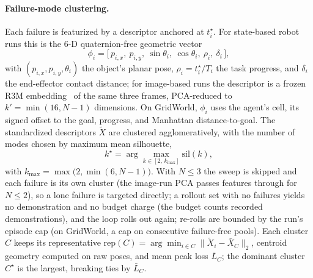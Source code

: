 \documentclass[letterpaper]{article} %
\begin{document}
\paragraph{Failure-mode clustering.}
Each failure is featurized by a descriptor anchored at $t^\star_i$. For
state-based robot runs this is the 6-D quaternion-free geometric vector
\begin{equation}
\phi_i=\big[\,p_{i,x},\ p_{i,y},\ \sin\theta_i,\ \cos\theta_i,\
\rho_i,\ \delta_i\,\big],
\label{eq:desc}
\end{equation}
with $(p_{i,x},p_{i,y},\theta_i)$ the object's planar pose,
$\rho_i=t^\star_i/T_i$ the task progress, and $\delta_i$ the end-effector
contact distance; for image-based runs the descriptor is a frozen R3M
embedding~\citep{nair2022r3m} of the same three frames, PCA-reduced to
$k'=\min(16,N{-}1)$ dimensions. On GridWorld, $\phi_i$ uses the agent's cell,
its signed offset to the goal, progress, and Manhattan distance-to-goal. The
standardized descriptors $\tilde X$ are clustered agglomeratively, with the
number of modes chosen by maximum mean silhouette,
\begin{equation}
k^\star=\arg\max_{k\in[2,\,k_{\max}]}\mathrm{sil}(k),
\label{eq:kstar}
\end{equation}
with $k_{\max}=\max\big(2,\min(6,N{-}1)\big)$. With $N\le 3$ the sweep is
skipped and each failure is its own cluster (the image-run PCA passes
features through for $N\le 2$), so a lone failure is targeted directly; a
rollout set with no failures yields no demonstration and no budget charge
(the budget counts recorded demonstrations), and the loop rolls out again;
re-rolls are bounded by the run's episode cap (on GridWorld, a cap on
consecutive failure-free pools).
Each cluster $C$ keeps its representative
$\mathrm{rep}(C)=\arg\min_{i\in C}\|\tilde X_i-\bar X_C\|_2$, centroid
geometry computed on raw poses, and mean peak loss $\bar L_C$; the dominant
cluster $C^\star$ is the largest, breaking ties by $\bar L_C$.
\end{document}
